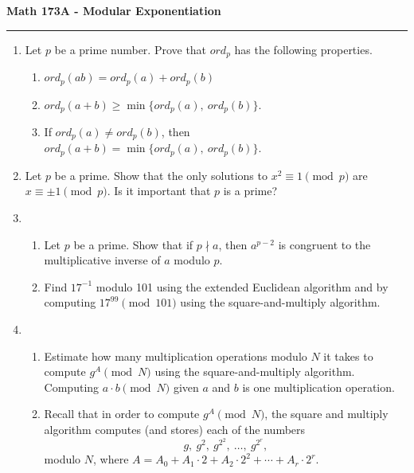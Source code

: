 \documentclass[11pt,letterpaper]{article}
\begin{document}
\begin{center}
{\bf \Large Math 173A - Modular Exponentiation}
\vspace{0.2cm}
\hrule
\end{center}

\begin{enumerate}

    \item Let $p$ be a prime number. Prove that $ord_p$ has the following properties.
    \begin{enumerate}
        \item $ord_p(ab) = ord_p(a) + ord_p(b)$
        \item $ord_p(a + b) \geq \min\{ord_p(a),\ ord_p(b)\}$.
        \item If $ord_p(a)\neq ord_p(b)$, then $ord_p(a+b) = \min\{ord_p(a),\ ord_p(b)\}$.

    \end{enumerate}

    \item Let $p$ be a prime. Show that the only solutions to $x^2 \equiv 1\pmod p$ are $x \equiv \pm 1\pmod p$. Is it important that $p$ is a prime?

    \item \begin{enumerate}
        \item Let $p$ be a prime. Show that if $p\nmid a$, then $a^{p-2}$ is congruent to the multiplicative inverse of $a$ modulo $p$.

        \item Find $17^{-1}$ modulo 101 using the extended Euclidean algorithm and by computing $17^{99}\pmod {101}$ using the square-and-multiply algorithm.
    \end{enumerate}


    \item \begin{enumerate}
        \item Estimate how many multiplication operations modulo $N$ it takes to compute $g^A\pmod N$ using the square-and-multiply algorithm. Computing $a\cdot b\pmod N$ given $a$ and $b$ is one multiplication operation.

        \item Recall that in order to compute $g^A\pmod N$, the square and multiply algorithm computes (and stores) each of the numbers
        \[
            g,\ g^2,\ g^{2^2},\ \ldots,\ g^{2^r},
        \]
        modulo $N$, where $A = A_0 + A_1\cdot 2 + A_2\cdot 2^2 + \cdots + A_r\cdot 2^r$.
    \end{enumerate}

\end{enumerate}
\end{document}
